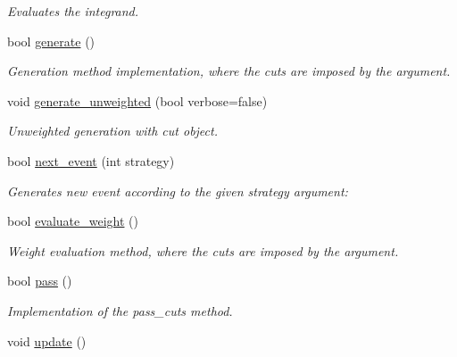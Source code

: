 \begin{DoxyCompactItemize}
\begin{DoxyCompactList}\small\item\em Evaluates the integrand. \end{DoxyCompactList}\item 
bool \hyperlink{a00430_a17ee544f823a680a9ab5966faf42e96a}{generate} ()
\begin{DoxyCompactList}\small\item\em Generation method implementation, where the cuts are imposed by the argument. \end{DoxyCompactList}\item 
\hypertarget{a00430_a2c8f6f384c66357a6878777ba5c9ea5c}{void \hyperlink{a00430_a2c8f6f384c66357a6878777ba5c9ea5c}{generate\-\_\-unweighted} (bool verbose=false)}\label{a00430_a2c8f6f384c66357a6878777ba5c9ea5c}

\begin{DoxyCompactList}\small\item\em Unweighted generation with cut object. \end{DoxyCompactList}\item 
\hypertarget{a00430_a5ca6db9f621c1c2fe4d579248df4fc32}{bool \hyperlink{a00430_a5ca6db9f621c1c2fe4d579248df4fc32}{next\-\_\-event} (int strategy)}\label{a00430_a5ca6db9f621c1c2fe4d579248df4fc32}

\begin{DoxyCompactList}\small\item\em Generates new event according to the given strategy argument\-: \end{DoxyCompactList}\item 
\hypertarget{a00430_a7b77349cc95414609dd0b373a77f0c7b}{bool \hyperlink{a00430_a7b77349cc95414609dd0b373a77f0c7b}{evaluate\-\_\-weight} ()}\label{a00430_a7b77349cc95414609dd0b373a77f0c7b}

\begin{DoxyCompactList}\small\item\em Weight evaluation method, where the cuts are imposed by the argument. \end{DoxyCompactList}\item 
\hypertarget{a00430_ac54c8dbf283d35111aee206ce1c1113e}{bool \hyperlink{a00430_ac54c8dbf283d35111aee206ce1c1113e}{pass} ()}\label{a00430_ac54c8dbf283d35111aee206ce1c1113e}

\begin{DoxyCompactList}\small\item\em Implementation of the pass\-\_\-cuts method. \end{DoxyCompactList}\item 
\hypertarget{a00430_a2bfb0915abfd67d74bc7add45269d3ac}{void \hyperlink{a00430_a2bfb0915abfd67d74bc7add45269d3ac}{update} ()}\label{a00430_a2bfb0915abfd67d74bc7add45269d3ac}


\end{DoxyCompactItemize}
